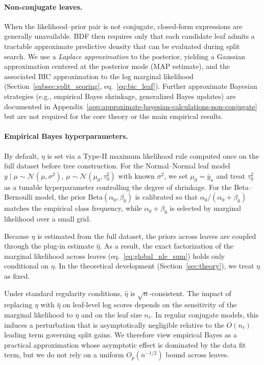 \documentclass[twoside,11pt]{article}
\begin{document}
\paragraph{Non-conjugate leaves.}
When the likelihood--prior pair is not conjugate, closed-form expressions are generally unavailable. BDF then requires only that each candidate leaf admits a tractable approximate predictive density that can be evaluated during split search. We use a \emph{Laplace approximation} to the posterior, yielding a Gaussian approximation centered at the posterior mode (MAP estimate), and the associated BIC approximation to the log marginal likelihood (Section~\ref{subsec:split_scoring}, eq.~\eqref{eq:bic_leaf}). Further approximate Bayesian strategies (e.g., empirical Bayes shrinkage, generalized Bayes updates) are documented in Appendix~\ref{app:approximate-bayesian-calculations-non-conjugate} but are not required for the core theory or the main empirical results.

\paragraph{Empirical Bayes hyperparameters.}\label{par:empirical_bayes}
By default, $\eta$ is set via a Type-II maximum likelihood rule computed once on the full dataset before tree construction. For the Normal--Normal leaf model $y \mid \mu \sim \mathcal{N}(\mu, \sigma^2)$, $\mu \sim \mathcal{N}(\mu_0, \tau_0^2)$ with known $\sigma^2$, we set $\mu_0 = \bar{y}_n$ and treat $\tau_0^2$ as a tunable hyperparameter controlling the degree of shrinkage. For the Beta--Bernoulli model, the prior $\mathrm{Beta}(\alpha_0, \beta_0)$ is calibrated so that $\alpha_0/(\alpha_0+\beta_0)$ matches the empirical class frequency, while $\alpha_0+\beta_0$ is selected by marginal likelihood over a small grid.

Because $\eta$ is estimated from the full dataset, the priors across leaves are coupled through the plug-in estimate $\hat\eta$. As a result, the exact factorization of the marginal likelihood across leaves (eq.~\eqref{eq:global_nle_sum}) holds only conditional on $\eta$. In the theoretical development (Section~\ref{sec:theory}), we treat $\eta$ as fixed.

Under standard regularity conditions, $\hat\eta$ is $\sqrt{n}$-consistent. The impact of replacing $\eta$ with $\hat\eta$ on leaf-level log scores depends on the sensitivity of the marginal likelihood to $\eta$ and on the leaf size $n_\ell$. In regular conjugate models, this induces a perturbation that is asymptotically negligible relative to the $O(n_\ell)$ leading term governing split gains. We therefore view empirical Bayes as a practical approximation whose asymptotic effect is dominated by the data fit term, but we do not rely on a uniform $O_p(n^{-1/2})$ bound across leaves.
\end{document}
